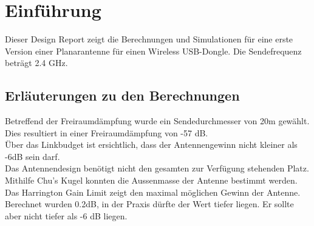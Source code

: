 \section{Einführung}
Dieser Design Report zeigt die Berechnungen und Simulationen für eine erste Version einer Planarantenne für einen Wireless USB-Dongle. Die Sendefrequenz beträgt 2.4 GHz. 

\subsection{Erläuterungen zu den Berechnungen}
Betreffend der Freiraumdämpfung wurde ein Sendedurchmesser von 20m gewählt. Dies resultiert in einer Freiraumdämpfung von -57 dB.\\Über das Linkbudget ist ersichtlich, dass der Antennengewinn nicht kleiner als -6dB sein darf.\\Das Antennendesign benötigt nicht den gesamten zur Verfügung stehenden Platz. Mithilfe Chu's Kugel konnten die Aussenmasse der Antenne bestimmt werden. Das Harrington Gain Limit zeigt den maximal möglichen Gewinn der Antenne. Berechnet wurden 0.2dB, in der Praxis dürfte der Wert tiefer liegen. Er sollte aber nicht tiefer als -6 dB liegen.



